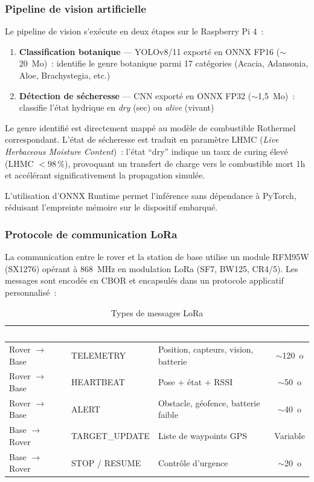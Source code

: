 \subsubsection{Pipeline de vision artificielle}

Le pipeline de vision s'exécute en deux étapes sur le Raspberry Pi 4~:

\begin{enumerate}[nosep]
    \item \textbf{Classification botanique} --- YOLOv8/11 exporté en ONNX FP16 ($\sim$20~Mo)~: identifie le genre botanique parmi 17 catégories (Acacia, Adansonia, Aloe, Brachystegia, etc.)
    \item \textbf{Détection de sécheresse} --- CNN exporté en ONNX FP32 ($\sim$1,5~Mo)~: classifie l'état hydrique en \textit{dry} (sec) ou \textit{alive} (vivant)
\end{enumerate}

Le genre identifié est directement mappé au modèle de combustible Rothermel correspondant. L'état de sécheresse est traduit en paramètre LHMC (\textit{Live Herbaceous Moisture Content})~: l'état ``dry'' indique un taux de curing élevé (LHMC $< 98$\,\%), provoquant un transfert de charge vers le combustible mort 1h et accélérant significativement la propagation simulée.

L'utilisation d'ONNX Runtime permet l'inférence sans dépendance à PyTorch, réduisant l'empreinte mémoire sur le dispositif embarqué.

\subsubsection{Protocole de communication LoRa}

La communication entre le rover et la station de base utilise un module RFM95W (SX1276) opérant à 868~MHz en modulation LoRa (SF7, BW125, CR4/5). Les messages sont encodés en CBOR et encapsulés dans un protocole applicatif personnalisé~:

\begin{table}[H]
\centering
\caption{Types de messages LoRa}
\begin{tabular}{|l|l|l|c|}
\hline
\rowcolor{NavyBlue} \textcolor{white}{\textbf{Direction}} & \textcolor{white}{\textbf{Type}} & \textcolor{white}{\textbf{Contenu}} & \textcolor{white}{\textbf{Taille}} \\
\hline
Rover $\rightarrow$ Base & TELEMETRY & Position, capteurs, vision, batterie & $\sim$120~o \\
Rover $\rightarrow$ Base & HEARTBEAT & Pose + état + RSSI & $\sim$50~o \\
Rover $\rightarrow$ Base & ALERT & Obstacle, géofence, batterie faible & $\sim$40~o \\
Base $\rightarrow$ Rover & TARGET\_UPDATE & Liste de waypoints GPS & Variable \\
Base $\rightarrow$ Rover & STOP / RESUME & Contrôle d'urgence & $\sim$20~o \\
\hline
\end{tabular}
\end{table}

